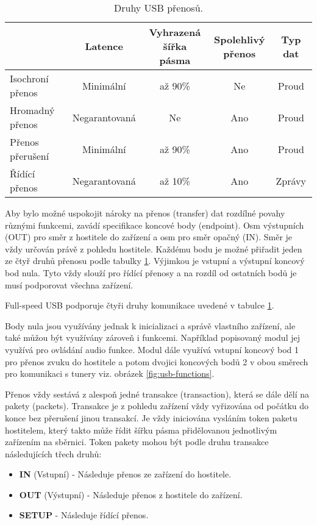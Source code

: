 \begin{table}[!ht]
\begin{center}
\begin{tabular}{|l|c|c|c|c|}
\hline 
 & Latence & \makecell{Vyhrazená šířka\\ pásma} & \makecell{Spolehlivý\\ přenos} & Typ dat \\ 
\hline 
Isochroní přenos & Minimální & až 90\% & Ne & Proud \\ 
\hline 
Hromadný přenos & Negarantovaná & Ne & Ano & Proud \\ 
\hline 
Přenos přerušení & Minimální & až 90\% & Ano & Proud \\ 
\hline 
Řídící přenos & Negarantovaná & až 10\% & Ano & Zprávy \\ 
\hline 
\end{tabular} 
\end{center}
\caption{Druhy USB přenosů.}
\label{tab:usb-transfer-types} 
\end{table}

Aby bylo možné uspokojit nároky na přenos (transfer) dat rozdílné povahy různými funkcemi, zavádí specifikace koncové body (endpoint). Osm výstupních (OUT) pro směr z hostitele do zařízení a osm pro směr opačný (IN). Směr je vždy určován právě z pohledu hostitele. Každému bodu je možné přiřadit jeden ze čtyř druhů přenosu podle tabulky \ref{tab:usb-transfer-types}. Výjimkou je  vstupní a výstupní koncový bod nula. Tyto vždy slouží pro řídící přenosy a na rozdíl od ostatních bodů je musí podporovat všechna zařízení.

Full-speed USB podporuje čtyři druhy komunikace uvedené v tabulce \ref{tab:usb-transfer-types}.


Body nula jsou využívány jednak k inicializaci a správě vlastního zařízení, ale také můžou být využívány zároveň i funkcemi. Například popisovaný modul jej využívá pro ovládání audio funkce.
Modul dále využívá vstupní koncový bod 1 pro přenos zvuku do hostitele a potom dvojici koncových bodů 2 v obou směrech pro komunikaci s tunery viz. obrázek \ref{fig:usb-functions}.

Přenos vždy sestává z alespoň jedné transakce (transaction), která se dále dělí na pakety (packets). Transakce je z pohledu zařízení vždy vyřizována od počátku do konce bez přerušení jinou transakcí. Je vždy iniciována vysláním token paketu hostitelem, který takto může řídit šířku pásma přidělovanou jednotlivým zařízením na sběrnici. Token pakety mohou být podle druhu transakce následujících třech druhů:
\begin{itemize}
\item \textbf{IN} (Vstupní) - Následuje přenos ze zařízení do hostitele.
\item \textbf{OUT} (Výstupní) - Následuje přenos z hostitele do zařízení.
\item \textbf{SETUP} - Následuje řídící přenos. 
\end{itemize}

